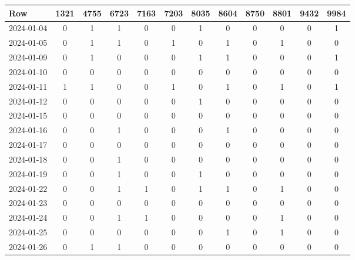 \documentclass[dvipdfmx,oneside]{article}
\begin{document}
\begingroup
\footnotesize
\begin{tabular}{lccccccccccc}
\toprule
               Row &  1321 &  4755 &  6723 &  7163 &  7203 &  8035 &  8604 &  8750 &  8801 &  9432 &  9984 \\
\midrule
        2024-01-04 &     0 &     1 &     1 &     0 &     0 &     1 &     0 &     0 &     0 &     0 &     1 \\
        2024-01-05 &     0 &     1 &     1 &     0 &     1 &     0 &     1 &     0 &     1 &     0 &     0 \\
        2024-01-09 &     0 &     1 &     0 &     0 &     0 &     1 &     1 &     0 &     0 &     0 &     1 \\
        2024-01-10 &     0 &     0 &     0 &     0 &     0 &     0 &     0 &     0 &     0 &     0 &     0 \\
        2024-01-11 &     1 &     1 &     0 &     0 &     1 &     0 &     1 &     0 &     1 &     0 &     1 \\
        2024-01-12 &     0 &     0 &     0 &     0 &     0 &     1 &     0 &     0 &     0 &     0 &     0 \\
        2024-01-15 &     0 &     0 &     0 &     0 &     0 &     0 &     0 &     0 &     0 &     0 &     0 \\
        2024-01-16 &     0 &     0 &     1 &     0 &     0 &     0 &     1 &     0 &     0 &     0 &     0 \\
        2024-01-17 &     0 &     0 &     0 &     0 &     0 &     0 &     0 &     0 &     0 &     0 &     0 \\
        2024-01-18 &     0 &     0 &     1 &     0 &     0 &     0 &     0 &     0 &     0 &     0 &     0 \\
        2024-01-19 &     0 &     0 &     1 &     0 &     0 &     1 &     0 &     0 &     0 &     0 &     0 \\
        2024-01-22 &     0 &     0 &     1 &     1 &     0 &     1 &     1 &     0 &     1 &     0 &     0 \\
        2024-01-23 &     0 &     0 &     0 &     0 &     0 &     0 &     0 &     0 &     0 &     0 &     0 \\
        2024-01-24 &     0 &     0 &     1 &     1 &     0 &     0 &     0 &     0 &     1 &     0 &     0 \\
        2024-01-25 &     0 &     0 &     0 &     0 &     0 &     0 &     1 &     0 &     1 &     0 &     0 \\
        2024-01-26 &     0 &     1 &     1 &     0 &     0 &     0 &     0 &     0 &     0 &     0 &     0 \\

\end{tabular}
\end{document}
